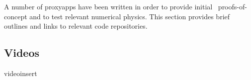 A number of proxyapps have been written in order to provide initial \nep \ proofs-of-concept and to test relevant 
numerical physics.  This section provides brief outlines and links to relevant code repositories.




\begin{warpHTML}
\ForceHTMLPage
\chapter*{Videos}\label{sec:videos}
 {}
videoinsert
\end{warpHTML}


